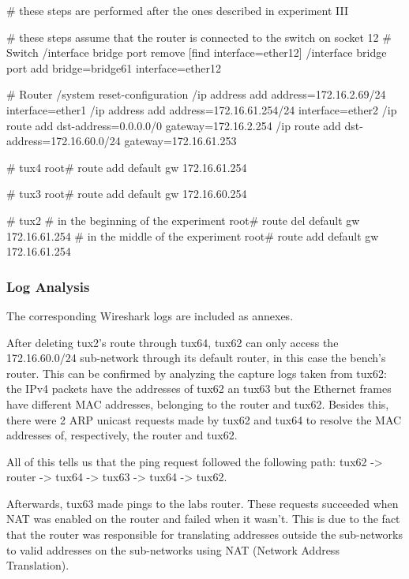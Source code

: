 \documentclass[11pt,a4paper,twocolumn]{article}
\begin{document}
\begin{code-bash}
# these steps are performed after the ones described in experiment III    

# these steps assume that the router is connected to the switch on socket 12
# Switch
/interface bridge port remove [find interface=ether12]
/interface bridge port add bridge=bridge61 interface=ether12

# Router
/system reset-configuration
/ip address add address=172.16.2.69/24 interface=ether1
/ip address add address=172.16.61.254/24 interface=ether2
/ip route add dst-address=0.0.0.0/0 gateway=172.16.2.254
/ip route add dst-address=172.16.60.0/24 gateway=172.16.61.253

# tux4
root# route add default gw 172.16.61.254

# tux3
root# route add default gw 172.16.60.254

# tux2
# in the beginning of the experiment
root# route del default gw 172.16.61.254
# in the middle of the experiment
root# route add default gw 172.16.61.254

\end{code-bash}

\subsubsection{Log Analysis}

The corresponding Wireshark logs are included as annexes.

After deleting tux2's route through tux64, tux62 can only access the 172.16.60.0/24 sub-network through its default router, in this case the bench's router.
This can be confirmed by analyzing the capture logs taken from tux62: the IPv4 packets have the addresses of tux62 an tux63 but the Ethernet frames have different MAC addresses, belonging to the router and tux62.
Besides this, there were 2 ARP unicast requests made by tux62 and tux64 to resolve the MAC addresses of, respectively, the router and tux62.

All of this tells us that the ping request followed the following path: tux62 -> router -> tux64 -> tux63 -> tux64 -> tux62.

Afterwards, tux63 made pings to the labs router. These requests succeeded when NAT was enabled on the router and failed when it wasn't. This is due to the fact that the router was responsible for translating addresses outside the sub-networks to valid addresses on the sub-networks using NAT (Network Address Translation).
\end{document}
